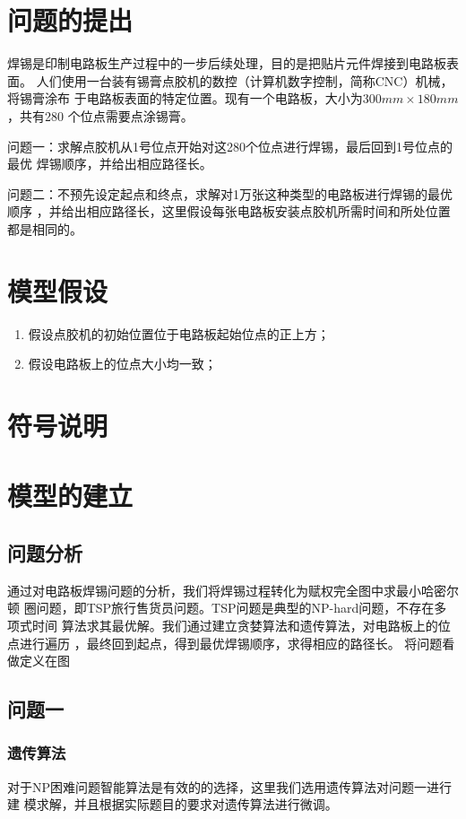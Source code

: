 \documentclass[fontset=windows,a4paper,12pt]{ctexart}
\begin{document}
  \newpage
  \tableofcontents
  \newpage
  \section{问题的提出}
    焊锡是印制电路板生产过程中的一步后续处理，目的是把贴片元件焊接到电路板表面。
    人们使用一台装有锡膏点胶机的数控（计算机数字控制，简称CNC）机械，将锡膏涂布
    于电路板表面的特定位置。现有一个电路板，大小为$300mm\times180mm$，共有280
    个位点需要点涂锡膏。

    问题一：求解点胶机从1号位点开始对这280个位点进行焊锡，最后回到1号位点的最优
    焊锡顺序，并给出相应路径长。

    问题二：不预先设定起点和终点，求解对1万张这种类型的电路板进行焊锡的最优顺序
    ，并给出相应路径长，这里假设每张电路板安装点胶机所需时间和所处位置都是相同的。
  \section{模型假设}
    \begin{enumerate}
      \item 假设点胶机的初始位置位于电路板起始位点的正上方；
      \item 假设电路板上的位点大小均一致；
    \end{enumerate}
  \section{符号说明}
  \section{模型的建立}
    \subsection{问题分析}
      通过对电路板焊锡问题的分析，我们将焊锡过程转化为赋权完全图中求最小哈密尔顿
      圈问题，即TSP旅行售货员问题。TSP问题是典型的NP-hard问题，不存在多项式时间
      算法求其最优解。我们通过建立贪婪算法和遗传算法，对电路板上的位点进行遍历
      ，最终回到起点，得到最优焊锡顺序，求得相应的路径长。
      将问题看做定义在图
    \subsection{问题一}
      \subsubsection{遗传算法}
        对于NP困难问题智能算法是有效的的选择，这里我们选用遗传算法对问题一进行建
        模求解，并且根据实际题目的要求对遗传算法进行微调。
        
\end{document}
